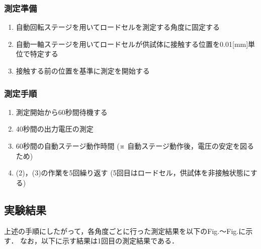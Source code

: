 \subsubsection{測定準備}
\begin{enumerate}[(1)]
	\item 自動回転ステージを用いてロードセルを測定する角度に固定する
	\item 自動一軸ステージを用いてロードセルが供試体に接触する位置を0.01[mm]単位で特定する
	\item 接触する前の位置を基準に測定を開始する
\end{enumerate}
\subsubsection{測定手順}
\begin{enumerate}[(1)]
	\item 測定開始から60秒間待機する
	\item 40秒間の出力電圧の測定
	\item 60秒間の自動ステージ動作時間 (※ 自動ステージ動作後，電圧の安定を図るため)
	\item (2)，(3)の作業を5回繰り返す (5回目はロードセル，供試体を非接触状態にする)
\end{enumerate}

\subsection{実験結果}

上述の手順にしたがって，各角度ごとに行った測定結果を以下のFig.～Fig.に示す．
なお，以下に示す結果は1回目の測定結果である．


